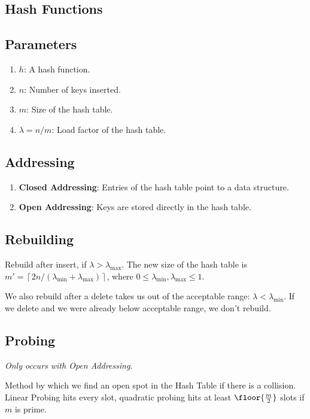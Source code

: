\documentclass[12pt, letterpaper]{article}
\newcommand{\ce}[1]{
    \left\lceil #1 \right\rceil
}
\begin{document}
\begin{multicols*}{3}
        
        \section{Hash Functions}

        \subsection{Parameters}
        \begin{enumerate}
            \item $h$: A hash function.
            \item $n$: Number of keys inserted.
            \item $m$: Size of the hash table.
            \item $\lambda = n / m$: Load factor of the hash table.
        \end{enumerate}

        \subsection{Addressing}
        \begin{enumerate}
            \item {\bf Closed Addressing}: Entries of the hash table point to a data structure.
            \item {\bf Open Addressing}: Keys are stored directly in the hash table.
        \end{enumerate}

        \subsection{Rebuilding}
        Rebuild after insert, if $\lambda > \lambda_\text{max}$. The new size
        of the hash table is $m' = \ce{2n / (\lambda_\text{min} + \lambda_\text{max})}$, 
        where $0 \le \lambda_\text{min}, \lambda_\text{max} \le 1$.

        We also rebuild after a delete takes us out of the acceptable range:  $\lambda <
        \lambda_\text{min}$. If we delete and we were already below acceptable range,
        we don't rebuild.

        \subsection{Probing}
        {\it Only occurs with Open Addressing}.

        Method by which we find an open spot in the Hash Table if there is a collision.
        Linear Probing hits every slot, quadratic probing hits at least $\floor{\frac{m}{2}}$ slots if $m$ is prime.

\end{multicols*}
\end{document}
